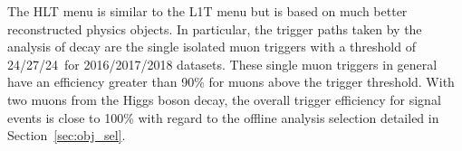 The HLT menu is similar to the L1T menu but is based on much better reconstructed physics objects.
In particular, the trigger paths taken by the analysis of \hmm decay are the single isolated muon triggers 
with a \pt threshold of 24/27/24~\GeV for 2016/2017/2018 datasets.  
These single muon triggers in general have an efficiency greater than 90\% for muons above the trigger threshold. 
With two muons from the Higgs boson decay, the overall trigger efficiency for signal events is close to 100\% with regard to the offline analysis selection detailed in Section~\ref{sec:obj_sel}.

